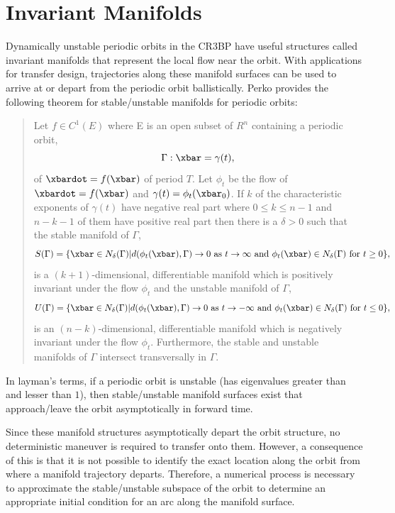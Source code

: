 \section{Invariant Manifolds}
Dynamically unstable periodic orbits in the CR3BP have useful structures called invariant manifolds
that represent the local flow near the orbit. With applications for transfer design, trajectories
along these manifold surfaces can be used to arrive at or depart from the periodic orbit
ballistically. Perko provides the following theorem for stable/unstable manifolds for periodic
orbits\cite{Perko:1991}:
\begin{quote}
    Let $f\in C^{1}(E)$ where E is an open subset of $R^{n}$ containing a periodic orbit,
    \begin{equation}
        \Gamma:\xbar=\gamma(t),
    \end{equation}
    of $\xbardot=f(\xbar)$ of period $T$. Let $\phi_{t}$ be the flow of $\xbardot=f(\xbar)$ and
    $\gamma(t)=\phi_{t}(\xbar_{0})$. If $k$ of the characteristic exponents of $\gamma(t)$ have
    negative real part where $0\leq k\leq n-1$ and $n-k-1$ of them have positive real part then
    there is a $\delta>0$ such that the stable manifold of $\Gamma$,
    \begin{equation}
        S(\Gamma)=\{\xbar\in N_{\delta}(\Gamma)|d(\phi_{t}(\xbar),\Gamma)\rightarrow0\text{ as }t\rightarrow\infty\text{ and }\phi_{t}(\xbar)\in N_{\delta}(\Gamma)\text{ for }t\geq0\},
    \end{equation}
    is a $(k+1)$-dimensional, differentiable manifold which is positively invariant under the flow
    $\phi_{t}$ and the unstable manifold of $\Gamma$,
    \begin{equation}
        U(\Gamma)=\{\xbar\in N_{\delta}(\Gamma)|d(\phi_{t}(\xbar),\Gamma)\rightarrow0\text{ as }t\rightarrow-\infty\text{ and }\phi_{t}(\xbar)\in N_{\delta}(\Gamma)\text{ for }t\leq0\},
    \end{equation}
    is an $(n-k)$-dimensional, differentiable manifold which is negatively invariant under the flow
    $\phi_{t}$. Furthermore, the stable and unstable manifolds of $\Gamma$ intersect transversally
    in $\Gamma$.
\end{quote}
In layman's terms, if a periodic orbit is unstable (has eigenvalues greater than and lesser than
$1$), then stable/unstable manifold surfaces exist that approach/leave the orbit asymptotically in
forward time.

Since these manifold structures asymptotically depart the orbit structure, no deterministic
maneuver is required to transfer onto them. However, a consequence of this is that it is not
possible to identify the exact location along the orbit from where a manifold trajectory departs.
Therefore, a numerical process is necessary to approximate the stable/unstable subspace of the
orbit to determine an appropriate initial condition for an arc along the manifold surface.

